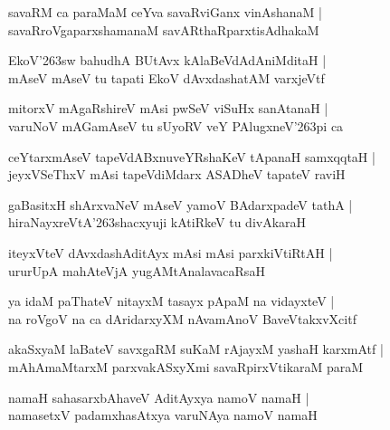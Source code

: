 \documentclass[twoside,12pt,openright]{book}
\def\S{\char'263}
\newcounter{shloka}[chapter]
\begin{document}
\begin{shloka}%
savaRM ca paraMaM  ceYva savaRviGanx vinAshanaM |\\
savaRroVgaparxshamanaM savARthaRparxtisAdhakaM 
\end{shloka}

\begin{shloka}%
EkoV\S sw bahudhA BUtAvx kAlaBeVdAdAniMditaH |\\
mAseV mAseV tu tapati EkoV dAvxdashatAM varxjeVtf
\end{shloka}

\begin{shloka}%
mitorxV mAgaRshireV mAsi pwSeV viSuHx sanAtanaH |\\
varuNoV mAGamAseV tu sUyoRV veY PAlugxneV\S pi ca 
\end{shloka}

\begin{shloka}%
ceYtarxmAseV tapeVdABxnuveYRshaKeV tApanaH samxqqtaH |\\
jeyxVSeThxV mAsi tapeVdiMdarx ASADheV tapateV raviH 
\end{shloka}

\begin{shloka}%
gaBasitxH shArxvaNeV mAseV yamoV BAdarxpadeV tathA |\\
hiraNayxreVtA\S shacxyuji kAtiRkeV tu divAkaraH 
\end{shloka}

\begin{shloka}%
iteyxVteV dAvxdashAditAyx mAsi mAsi parxkiVtiRtAH |\\
ururUpA mahAteVjA yugAMtAnalavacaRsaH 
\end{shloka}

\begin{shloka}%
ya idaM paThateV nitayxM tasayx pApaM na vidayxteV |\\
na roVgoV na ca dAridarxyXM nAvamAnoV BaveVtakxvXcitf 
\end{shloka}

\begin{shloka}%
akaSxyaM laBateV savxgaRM suKaM rAjayxM yashaH karxmAtf |\\
mAhAmaMtarxM parxvakASxyXmi savaRpirxVtikaraM paraM 
\end{shloka}

\begin{shloka}%
namaH sahasarxbAhaveV AditAyxya namoV namaH |\\
namasetxV padamxhasAtxya varuNAya namoV namaH
\end{shloka}
\end{document}
